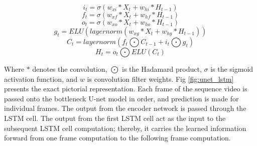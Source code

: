     \begin{equation}
    	i_t = \sigma(w_{xi}*X_t+w_{hi}*H_{t-1})
    	\label{eq:it}
    \end{equation}
    \begin{equation}
		f_t = \sigma(w_{xf}*X_t+w_{hf}*H_{t-1})
		\label{eq:ft}
	\end{equation}    
    \begin{equation}
	 	o_t = \sigma(w_{xo}*X_t+w_{ho}*H_{t-1})
	 	\label{eq:ot}
 	\end{equation}   
    \begin{equation}
	    g_t = ELU(layernorm(w_{xg}*X_t+w_{hg}*H_{t-1}))
	    \label{eq:gt}
    \end{equation}
    \begin{equation}
	    C_t = layernorm(f_t \bigodot C_{t-1} +i_t \bigodot g_t)
	    \label{eq:Ct}
    \end{equation}
    \begin{equation}
	    H_t = o_t \bigodot ELU(C_t)
	    \label{eq:Ht}
    \end{equation}
    
    Where $*$ denotes the convolution, $\bigodot$ is the Hadamard product, $\sigma$ is the sigmoid activation function, and $w$ is convolution filter weights. Fig \ref{fig:unet_lstm} presents the exact pictorial representation. Each frame of the sequence video is passed onto the bottleneck U-net model in order, and prediction is made for individual frames. The output from the encoder network is passed through the LSTM cell. The output from the first LSTM cell act as the input to the subsequent LSTM cell computation; thereby, it carries the learned information forward from one frame computation to the following frame computation.   
    
